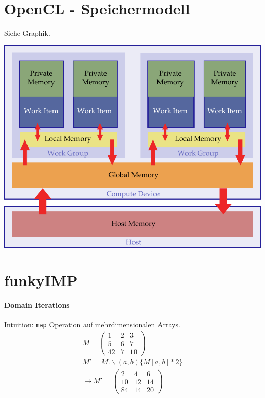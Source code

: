 \documentclass{article}
\begin{document}
\section{OpenCL - Speichermodell}
Siehe Graphik. \\

\begin{center}
	\includegraphics[width=0.75\linewidth]{../../images/memory_hierarchy}
\end{center}

\section{funkyIMP}
\paragraph{Domain Iterations} Intuition: \texttt{map} Operation auf mehrdimensionalen Arrays. \\

\begin{gather*}
		M = \begin{pmatrix}
			1 & 2 & 3 \\
			5 & 6 & 7  \\
			42 & 7 & 10
		\end{pmatrix} \\
		M' = M.\backslash(a,b) \{M[a,b] * 2\} \\
		\rightarrow M' = \begin{pmatrix}
			2 & 4 & 6 \\
			10 & 12 & 14  \\
			84 & 14 & 20
		\end{pmatrix}
\end{gather*}
\end{document}
